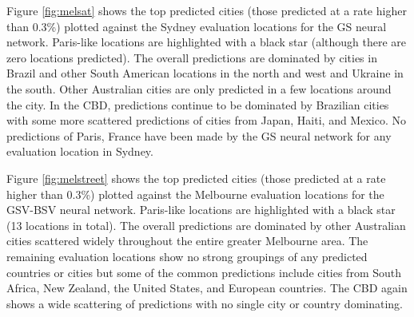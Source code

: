 \documentclass[sageh,times]{sagej}
\begin{document}
Figure \ref{fig:melsat} shows the top predicted cities (those predicted at a rate higher than 0.3\%) plotted against the Sydney evaluation locations for the GS neural network. Paris-like locations are highlighted with a black star (although there are zero locations predicted). The overall predictions are dominated by cities in Brazil and other South American locations in the north and west and Ukraine in the south. Other Australian cities are only predicted in a few locations around the city. In the CBD, predictions continue to be dominated by Brazilian cities with some more scattered predictions of cities from Japan, Haiti, and Mexico. No predictions of Paris, France have been made by the GS neural network for any evaluation location in Sydney.

Figure \ref{fig:melstreet} shows the top predicted cities (those predicted at a rate higher than 0.3\%) plotted against the Melbourne evaluation locations for the GSV-BSV neural network. Paris-like locations are highlighted with a black star (13 locations in total). The overall predictions are dominated by other Australian cities scattered widely throughout the entire greater Melbourne area. The remaining evaluation locations show no strong groupings of any predicted countries or cities but some of the common predictions include cities from South Africa, New Zealand, the United States, and European countries. The CBD again shows a wide scattering of predictions with no single city or country dominating.
\end{document}
